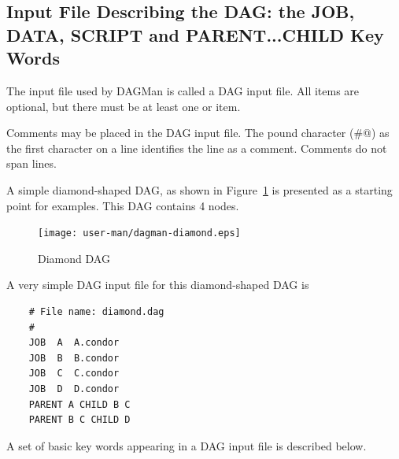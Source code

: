 \subsection{Input File Describing the DAG: the JOB, DATA, SCRIPT and PARENT...CHILD Key Words}

The input file used by DAGMan is called a DAG input file.
All items are optional, but there must be at least one 
or  item.

Comments may be placed in the DAG input file.
The pound character (\verb@#@) as the first character on a
line identifies the line as a comment.
Comments do not span lines.

A simple diamond-shaped DAG, as shown in
Figure~\ref{fig:dagman-diamond}
is presented as a starting point for examples.
This DAG contains 4 nodes.

\begin{figure}[hbt]
\centering
\texttt{[image: user-man/dagman-diamond.eps]}
\caption{\label{fig:dagman-diamond}Diamond DAG}
\end{figure}


A very simple DAG input file for this diamond-shaped DAG is

\footnotesize
\begin{verbatim}
    # File name: diamond.dag
    #
    JOB  A  A.condor 
    JOB  B  B.condor 
    JOB  C  C.condor	
    JOB  D  D.condor
    PARENT A CHILD B C
    PARENT B C CHILD D
\end{verbatim}
\normalsize

A set of basic key words appearing in a DAG input file is described below.

